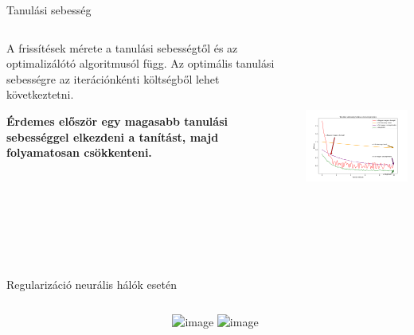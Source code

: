 \documentclass[english, aspectratio=169]{beamer}
\begin{document}
\begin{frame}{Tanulási sebesség}
\begin{columns}
\begin{column}{.4\textwidth}
A frissítések mérete a tanulási sebességtől és az optimalizálótó algoritmusól függ. Az optimális tanulási sebességre az iterációnkénti költségből lehet következtetni.\par\medskip
\textbf{Érdemes először egy magasabb tanulási sebességgel elkezdeni a tanítást, majd folyamatosan csökkenteni. }
\end{column}
\begin{column}{.6\textwidth}
\begin{center}
\includegraphics[width=9.5cm, height=7cm, keepaspectratio]{images/neural_7.png}
\end{center}
\end{column}
\end{columns}
\end{frame}

\begin{frame}{Regularizáció neurális hálók esetén}
\begin{columns}
\begin{column}{.5\textwidth}
\end{column}
\begin{column}{.5\textwidth}
\begin{center}
\includegraphics<1>[width=7cm, height=7cm, keepaspectratio]{graphs/neural_10.png}
\includegraphics<2>[width=7cm, height=7cm, keepaspectratio]{graphs/neural_12.png}
\end{center}
\end{column}
\end{columns}
\end{frame}
\end{document}
